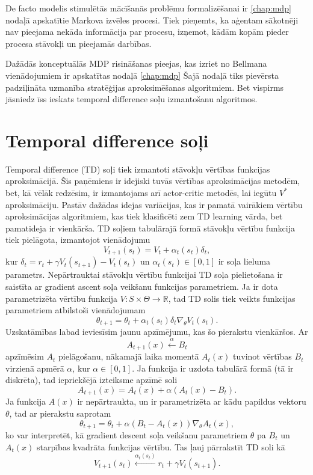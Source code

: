 \documentclass{ludis} %
\begin{document}
De facto modelis stimulētās mācīšanās problēmu formalizēšanai ir \ref{chap:mdp} nodaļā apskatītie Markova izvēles procesi.
Tiek pieņemts, ka aģentam sākotnēji nav pieejama nekāda informācija par procesu, izņemot, kādām kopām pieder procesa stāvokļi un pieejamās darbības.

Dažādās konceptuālās MDP risināšanas pieejas, kas izriet no Bellmana vienādojumiem ir apskatītas nodaļā \ref{chap:mdp}
Šajā nodaļā tiks pievērsta padziļināta uzmanība stratēģijas aproksimēšanas algoritmiem.
Bet vispirms jāsniedz īss ieskats temporal difference soļu izmantošanu algoritmos.

\section{Temporal difference soļi} \label{chap:td}
Temporal difference (TD) soļi tiek izmantoti stāvokļu vērtības funkcijas aproksimācijā.
Šis paņēmiens ir idejiski tuvās vērtības aproksimācijas metodēm, bet, kā vēlāk redzēsim, ir izmantojams arī actor-critic metodēs, lai iegūtu $V^*$ aproksimāciju.
Pastāv dažādas idejas variācijas, kas ir pamatā vairākiem vērtību aproksimācijas algoritmiem, kas tiek klasificēti zem TD learning vārda, bet pamatideja ir vienkārša.
TD soļiem tabulārajā formā stāvokļu vērtību funkcija tiek pielāgota, izmantojot vienādojumu
\[
	V_{t+1}(s_t) = V_t + \alpha_t(s_t) \delta_t,
\]
kur $\delta_t = r_{t} + \gamma V_t(s_{t + 1}) - V_t(s_t)$ un $\alpha_t(s_t) \in [0,1]$ ir soļa lieluma parametrs.
Nepārtrauktai stāvokļu vērtību funkcijai TD soļa pielietošana ir saistīta ar gradient ascent soļa veikšanu funkcijas parametriem.
Ja ir dota parametrizēta vērtību funkcija $V:S \times \Theta \rightarrow \mathbb{R}$, tad TD solis tiek veikts funkcijas parametriem atbilstoši vienādojumam
\[
	\theta_{t+1} = \theta_t + \alpha_t(s_t) \delta_t \nabla_\theta V_t(s_t).
\]
Uzskatāmības labad ieviesīsim jaunu apzīmējumu, kas šo pierakstu vienkāršos.
Ar
\[
	A_{t+1}(x) \xleftarrow{\alpha} B_t
\]
apzīmēsim $A_t$ pielāgošanu, nākamajā laika momentā $A_t(x)$ tuvinot vērtības $B_t$ virzienā apmērā $\alpha$, kur $\alpha \in [0,1]$.
Ja funkcija ir uzdota tabulārā formā (tā ir diskrēta), tad iepriekšējā izteiksme apzīmē soli
\[
	A_{t+1}(x) = A_t(x) + \alpha(A_t(x) - B_t).
\]
Ja funkcija $A(x)$ ir nepārtraukta, un ir parametrizēta ar kādu papildus vektoru $\theta$, tad ar pierakstu saprotam
\[
	\theta_{t+1} = \theta_t + \alpha \left(B_t - A_t(x)\right) \nabla_\theta A_t(x),
\]
ko var interpretēt, kā gradient descent soļa veikšanu parametriem $\theta$ pa $B_t$ un $A_t(x)$ starpības kvadrāta funkcijas vērtību.
Tas ļauj pārrakstīt TD soli kā
\[
	V_{t+1}(s_t) \xleftarrow{\alpha_t(s_t)} r_t + \gamma V_t(s_{t + 1}).
\]
\end{document}
